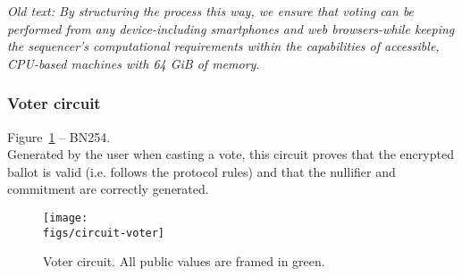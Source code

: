 \textit{Old text: By structuring the process this way, we ensure that voting can be performed from any device-including smartphones and web browsers-while keeping the sequencer's computational requirements within the capabilities of accessible, CPU-based machines with 64 GiB of memory.}




\subsubsection{Voter circuit} 

Figure~\ref{fig:circuit-voter} -- BN254.\\

\noi Generated by the user when casting a vote, this circuit proves that the encrypted ballot is valid (i.e. follows the protocol rules) and that the nullifier and commitment are correctly generated.

\begin{figure}[H]
	\centerline{\texttt{[image: \\figs/circuit-voter]}}
	\caption{Voter circuit. All public values are framed in green.}
	\label{fig:circuit-voter}
\end{figure}


